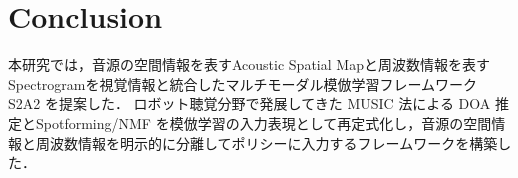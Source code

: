 \documentclass{article}
\begin{document}















\section{Conclusion}
\label{sec:conclusion}
	本研究では，音源の空間情報を表すAcoustic Spatial Mapと周波数情報を表すSpectrogramを視覚情報と統合したマルチモーダル模倣学習フレームワーク S2A2 を提案した．
	ロボット聴覚分野で発展してきた MUSIC 法による DOA 推定とSpotforming/NMF を模倣学習の入力表現として再定式化し，音源の空間情報と周波数情報を明示的に分離してポリシーに入力するフレームワークを構築した．
\end{document}

